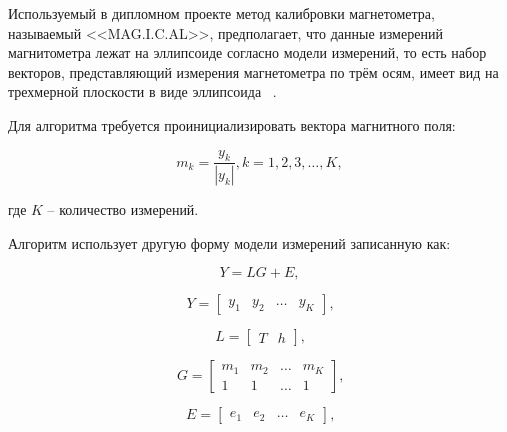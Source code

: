 Используемый в дипломном проекте метод калибровки магнетометра, называемый <<MAG.I.C.AL>>, предполагает, что данные измерений магнитометра
лежат на эллипсоиде согласно модели измерений, то есть набор векторов, представляющий измерения магнетометра по трём осям, 
имеет вид на трехмерной плоскости в виде эллипсоида ~\cite{magical}. %

Для алгоритма требуется проинициализировать вектора магнитного поля:

\begin{equation}
    \label{eq:domain:initMK}
    m_{k} = \frac{y_{k}}{\left|y_{k}\right|}, k=1,2,3,\dots ,K,
  \end{equation}
  \begin{explanationx}
    \item[где] $K$ -- количество измерений.
  \end{explanationx}

Алгоритм использует другую форму модели измерений записанную как:

\begin{equation}
    \label{eq:domain:updatedMagnetModel}
    Y = LG+E,
  \end{equation}

\begin{equation}
    \label{eq:domain:Y}
    Y = \begin{bmatrix}
        y_{1} & y_{2} & \dots & y_{K}
        \end{bmatrix}
        \text{,}
  \end{equation}

\begin{equation}
    \label{eq:domain:L}
    L = \begin{bmatrix}
        T & h
        \end{bmatrix}
        \text{,}
  \end{equation}

\begin{equation}
    \label{eq:domain:G}
    G = \begin{bmatrix}
        m_{1} & m_{2} & \dots & m_{K} \\
        1 & 1 & \dots & 1
        \end{bmatrix}
        \text{,}
  \end{equation}

\begin{equation}
    \label{eq:domain:E}
    E = \begin{bmatrix}
            e_{1} & e_{2} & \dots & e_{K}
        \end{bmatrix}
        \text{,}
  \end{equation}

